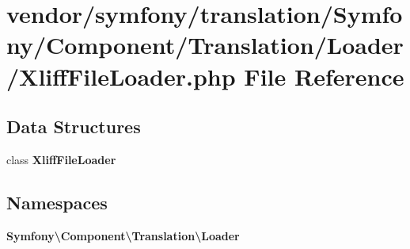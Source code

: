 \section{vendor/symfony/translation/\+Symfony/\+Component/\+Translation/\+Loader/\+Xliff\+File\+Loader.php File Reference}
\label{_xliff_file_loader_8php}
\subsection*{Data Structures}
\begin{DoxyCompactItemize}
\item 
class {\bf Xliff\+File\+Loader}
\end{DoxyCompactItemize}
\subsection*{Namespaces}
\begin{DoxyCompactItemize}
\item 
 {\bf Symfony\textbackslash{}\+Component\textbackslash{}\+Translation\textbackslash{}\+Loader}
\end{DoxyCompactItemize}
